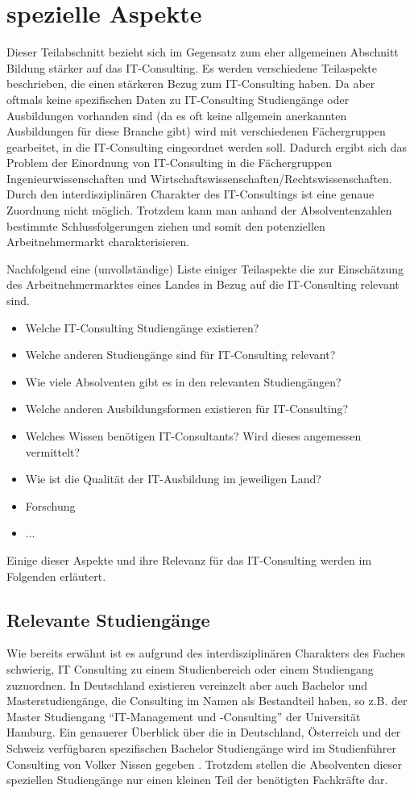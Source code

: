  \section{spezielle Aspekte}
Dieser Teilabschnitt bezieht sich im Gegensatz zum eher allgemeinen Abschnitt Bildung stärker auf das IT-Consulting. Es werden verschiedene Teilaspekte beschrieben, die einen stärkeren Bezug zum IT-Consulting haben. Da aber oftmals keine spezifischen Daten zu IT-Consulting Studiengänge oder Ausbildungen vorhanden sind (da es oft keine allgemein anerkannten Ausbildungen für diese Branche gibt) wird mit verschiedenen Fächergruppen gearbeitet, in die IT-Consulting eingeordnet werden soll. 
Dadurch ergibt sich das Problem der Einordnung von IT-Consulting in die Fächergruppen Ingenieurwissenschaften und Wirtschaftswissenschaften/Rechtswissenschaften. Durch den interdisziplinären Charakter des IT-Consultings ist eine genaue Zuordnung nicht möglich. Trotzdem kann man anhand der Absolventenzahlen bestimmte Schlussfolgerungen ziehen und somit den potenziellen Arbeitnehmermarkt charakterisieren.

Nachfolgend eine (unvollständige) Liste einiger Teilaspekte die zur Einschätzung des Arbeitnehmermarktes eines Landes in Bezug auf die IT-Consulting relevant sind. 
\begin{itemize} 
\item Welche IT-Consulting Studiengänge existieren?
\item Welche anderen Studiengänge sind für IT-Consulting relevant?
\item Wie viele Absolventen gibt es in den relevanten Studiengängen?
\item Welche anderen Ausbildungsformen existieren für IT-Consulting?
\item Welches Wissen benötigen IT-Consultants? Wird dieses angemessen vermittelt?
\item Wie ist die Qualität der IT-Ausbildung im jeweiligen Land?
\item Forschung
\item ...
\end{itemize}

Einige dieser Aspekte und ihre Relevanz für das IT-Consulting werden im Folgenden erläutert.

\subsection*{Relevante Studiengänge}
Wie bereits erwähnt ist es aufgrund des interdisziplinären Charakters des Faches schwierig, IT Consulting zu einem Studienbereich oder einem Studiengang zuzuordnen. 
In Deutschland existieren vereinzelt aber auch Bachelor und Masterstudiengänge, die Consulting im Namen als Bestandteil haben, so z.B. der Master Studiengang ``IT-Management und -Consulting'' der Universität Hamburg. Ein genauerer Überblick über die in Deutschland, Österreich und der Schweiz verfügbaren spezifischen Bachelor Studiengänge wird im Studienf{\"u}hrer Consulting von Volker Nissen gegeben \cite{NissenKlaukDeelmannMohe201209}. Trotzdem stellen die Absolventen dieser speziellen Studiengänge nur einen kleinen Teil der benötigten Fachkräfte dar.

